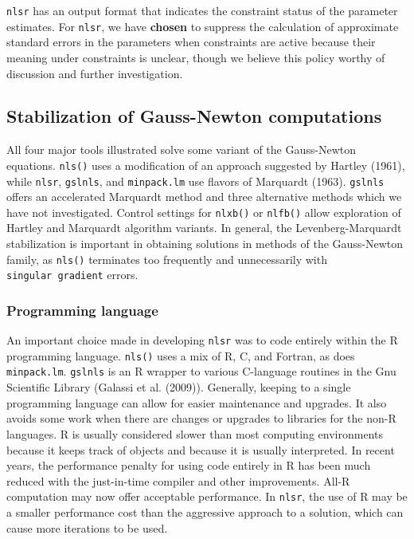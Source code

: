 \texttt{nlsr} has an output format that indicates the constraint status of the parameter
estimates. For \texttt{nlsr}, we have \textbf{chosen} to suppress the calculation of
approximate standard errors in the parameters when constraints are active because
their meaning under constraints is unclear, though we believe this
policy worthy of discussion and further investigation.

\subsection{Stabilization of Gauss-Newton computations}\label{stabilization-of-gauss-newton-computations}

All four major tools illustrated solve some variant of the Gauss-Newton
equations. \texttt{nls()} uses a modification of an approach suggested by Hartley (1961),
while \texttt{nlsr}, \texttt{gslnls}, and \texttt{minpack.lm} use flavors of Marquardt (1963). \texttt{gslnls}
offers an accelerated Marquardt method and three alternative methods which we
have not investigated.
Control settings for \texttt{nlxb()} or \texttt{nlfb()} allow exploration of Hartley and Marquardt
algorithm variants. In general, the Levenberg-Marquardt stabilization
is important in obtaining
solutions in methods of the Gauss-Newton family, as \texttt{nls()} terminates
too frequently and unnecessarily with \texttt{singular\ gradient} errors.

\subsubsection{Programming language}\label{programming-language}

An important choice made in developing \texttt{nlsr} was to code entirely within the R
programming language. \texttt{nls()} uses a mix of R, C, and Fortran, as does \texttt{minpack.lm}.
\texttt{gslnls} is an R wrapper to various C-language routines in the Gnu Scientific
Library (Galassi et al. (2009)).
Generally, keeping to a single programming language can allow for
easier maintenance and upgrades. It also avoids some work when there are changes
or upgrades to libraries for the non-R languages.
R is usually considered slower
than most computing environments because it keeps track of objects and
because it is usually interpreted. In recent years, the
performance penalty for using code entirely in R has been much reduced
with the just-in-time compiler and other improvements. All-R computation
may now offer acceptable performance. In \texttt{nlsr}, the use of R may be a
smaller performance cost than the aggressive approach to a solution,
which can cause more iterations to be used.


